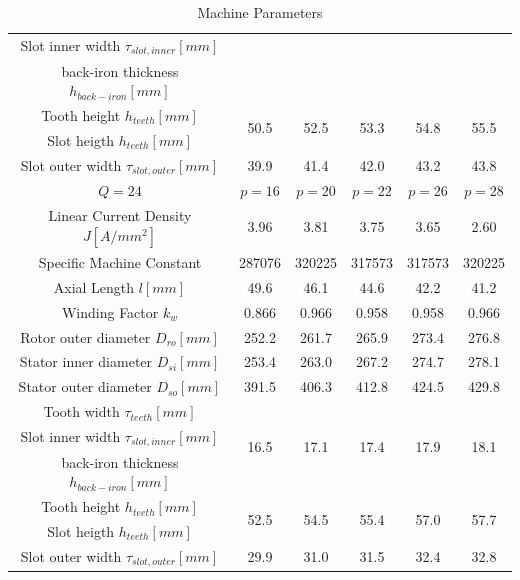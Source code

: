 \documentclass [a4 paper, 11pt, titlepage] {article}
\begin{document}
\begin{table}[h]
\begin{center}
\begin{tabular}{c|c|c|c|c|c}
				Slot inner width $\tau_{slot,inner} [mm]$ & & & & & \\
				back-iron thickness $h_{back-iron} [mm]$ & & & & & \\
				Tooth height $h_{teeth} [mm]$ & \multirow{2}{4em}{50.5} & \multirow{2}{4em}{52.5} & \multirow{2}{4em}{53.3} & \multirow{2}{4em}{54.8} & \multirow{2}{4em}{55.5} \\
				Slot heigth $h_{teeth} [mm]$ &  &  &  &  & \\
				Slot outer width $\tau_{slot,outer} [mm]$ & 39.9 & 41.4 & 42.0 & 43.2 & 43.8 \\
				\hline\hline
				$Q=24$ & $p=16$ & $p=20$ & $p=22$ & $p=26$ & $p=28$ \\
				\hline
				Linear Current Density $J [A/mm^2]$ & 3.96 & 3.81 & 3.75 & 3.65 & 2.60 \\
				Specific Machine Constant & 287076 & 320225 & 317573 & 317573 & 320225 \\
				Axial Length $l [mm]$ & 49.6 & 46.1 & 44.6 & 42.2 & 41.2 \\
				Winding Factor $k_w$ & 0.866 & 0.966 & 0.958 & 0.958 & 0.966 \\
				Rotor outer diameter $D_{ro} [mm]$ & 252.2 & 261.7 & 265.9 & 273.4 & 276.8 \\
				Stator inner diameter $D_{si} [mm]$ & 253.4 & 263.0 & 267.2 & 274.7 & 278.1 \\
				Stator outer diameter $D_{so} [mm]$ & 391.5 & 406.3 & 412.8 & 424.5 & 429.8 \\
				Tooth width $\tau_{teeth} [mm]$ & \multirow{3}{4em}{16.5} & \multirow{3}{4em}{17.1} & \multirow{3}{4em}{17.4} & \multirow{3}{4em}{17.9} & \multirow{3}{4em}{18.1} \\
				Slot inner width $\tau_{slot,inner} [mm]$ & & & & & \\
				back-iron thickness $h_{back-iron} [mm]$ & & & & & \\
				Tooth height $h_{teeth} [mm]$ & \multirow{2}{4em}{52.5} & \multirow{2}{4em}{54.5} & \multirow{2}{4em}{55.4} & \multirow{2}{4em}{57.0} & \multirow{2}{4em}{57.7} \\
				Slot heigth $h_{teeth} [mm]$ &  &  &  &  & \\
				Slot outer width $\tau_{slot,outer} [mm]$ & 29.9 & 31.0 & 31.5 & 32.4 & 32.8 \\
			\end{tabular}
		\end{center}
		\caption{Machine Parameters}
		\label{tab:EMparameters}
	\end{table}
	
\end{document}
